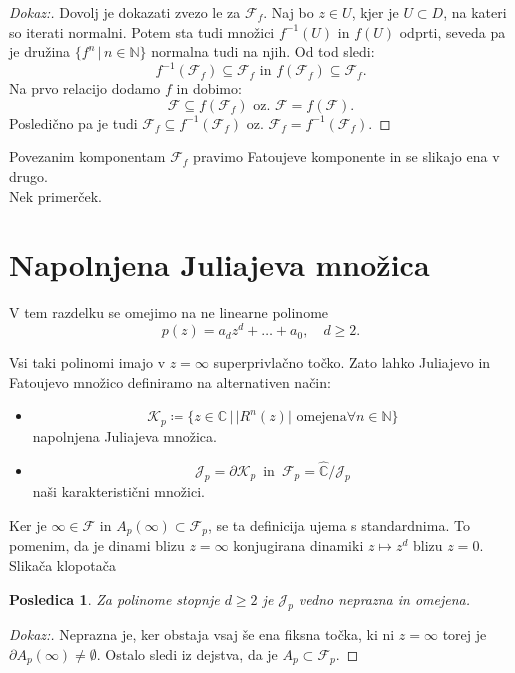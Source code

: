 \documentclass{article}
\newtheorem{posledica}{Posledica}
\newcommand{\C}{\mathbb{C}}
\newcommand{\N}{\mathbb{N}}
\newcommand{\F}{\mathcal{F}}
\begin{document}
\begin{proof}[Dokaz:]
Dovolj je dokazati zvezo le za $\F_f$. Naj bo $z\in U$, kjer je $U \subset D$, na kateri so iterati normalni. Potem sta tudi množici $f^{-1}(U)$ in $f(U)$ odprti, seveda pa je družina $\{f^n \,|\, n\in \N\}$ normalna tudi na njih. Od tod sledi:
$$
f^{-1}(\F_f) \subseteq \F_f \text{ in } f(\F_f) \subseteq \F_f.
$$
Na prvo relacijo dodamo $f$ in dobimo:
$$
\F \subseteq f(\F_f) \text{ oz. } \F = f(\F).
$$
Posledično pa je tudi $\F_f \subseteq f^{-1}(\F_f)$ oz. $\F_f = f^{-1}(\F_f)$.
\end{proof}

Povezanim komponentam $\F_f$ pravimo Fatoujeve komponente in se slikajo ena v drugo.\\ 
Nek primerček.


\section{Napolnjena Juliajeva množica}

V tem razdelku se omejimo na ne linearne polinome
$$
p(z) = a_d z^d + \dots + a_0, \quad d \geq 2.
$$

Vsi taki polinomi imajo v $z = \infty$ superprivlačno točko. Zato lahko Juliajevo 
in Fatoujevo množico definiramo na alternativen način:
\begin{itemize}
    \item  
$$
\mathcal{K}_p \coloneqq \{z\in \C \,|\, |R^n(z)| \text{ omejena} \forall n\in \N\}
$$
napolnjena Juliajeva množica.
\item 
$$
\mathcal{J}_p = \partial \mathcal{K}_p \,\text{ in }\, \mathcal{F}_p = \hat{\C}\slash \mathcal{J}_p
$$
naši karakteristični množici. 
\end{itemize}
Ker je $\infty \in \F$ in $A_p(\infty) \subset \F_p$, se ta definicija 
ujema s standardnima. To pomenim, da je dinami blizu $z = \infty$ 
konjugirana dinamiki $z \mapsto z^d$ blizu $z = 0$.\\
Slikača klopotača\\
\begin{posledica}
Za polinome stopnje $d\geq 2$ je $\mathcal{J}_p$ vedno neprazna in omejena.
\end{posledica}

\begin{proof}[Dokaz:]
    Neprazna je, ker obstaja vsaj še ena fiksna točka, ki ni $z = \infty$
    torej je $\partial A_p(\infty) \neq \emptyset$. Ostalo sledi iz dejstva, 
    da je $A_p \subset \F_p$.
\end{proof}
\end{document}
